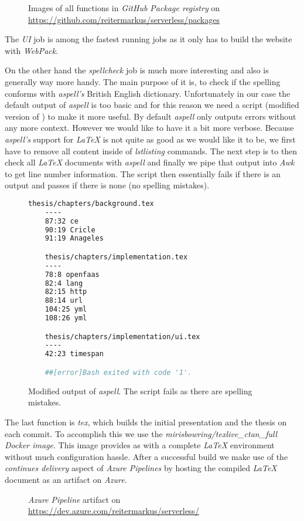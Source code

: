 \begin{figure}[H]
  \centering
  \caption{Images of all functions in \textit{GitHub Package registry} on \url{https://github.com/reitermarkus/serverless/packages}}
\end{figure}

The \textit{UI} job is among the fastest running jobs as it only has to build the website with
\textit{WebPack}.

On the other hand the \textit{spellcheck} job is much more interesting and also is generally way
more handy. The main purpose of it is, to check if the spelling conforms with \textit{aspell's}
British English dictionary. Unfortunately in our case the default output of \textit{aspell} is too
basic and for this reason we need a script (modified version of \cite{aspell-awk}) to make it more
useful. By default \textit{aspell} only outputs errors without any more context. However we would
like to have it a bit more verbose. Because \textit{aspell's} support for \textit{LaTeX} is not
quite as good as we would like it to be, we first have to remove all content inside of
\textit{lstlisting} commands. The next step is to then check all \textit{LaTeX} documents with
\textit{aspell} and finally we pipe that output into \textit{Awk} to get line number information.
The script then essentially fails if there is an output and passes if there is none (no spelling
mistakes).

\begin{figure}[H]
  \begin{lstlisting}[language=bash]
    thesis/chapters/background.tex
    ----
    87:32 ce
    90:19 Cricle
    91:19 Anageles

    thesis/chapters/implementation.tex
    ----
    78:8 openfaas
    82:4 lang
    82:15 http
    88:14 url
    104:25 yml
    108:26 yml

    thesis/chapters/implementation/ui.tex
    ----
    42:23 timespan

    ##[error]Bash exited with code '1'.
  \end{lstlisting}
  \caption{Modified output of \textit{aspell}. The script fails as there are spelling mistakes.}
\end{figure}

The last function is \textit{tex}, which builds the initial presentation and the thesis on each
commit. To accomplish this we use the \textit{mirisbowring/texlive\_ctan\_full Docker image}. This
image provides as with a complete \textit{LaTeX} environment without much configuration hassle.
After a successful build we make use of the \textit{continues delivery} aspect of \textit{Azure
Pipelines} by hosting the compiled \textit{LaTeX} document as an artifact on \textit{Azure}.

\begin{figure}[H]
  \centering
  \caption{\textit{Azure Pipeline} artifact on \url{https://dev.azure.com/reitermarkus/serverless/}}
\end{figure}
